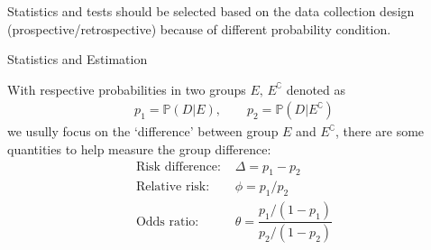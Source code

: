     Statistics and tests should be selected based on the data collection design (prospective/retrospective) because of different probability condition.
    
\begin{point}
    Statistics and Estimation
\end{point}


    With respective probabilities in two groups $ E,\,E^\complement $ denoted as
    \begin{align}
        p_1=\mathbb{P}\left( D|E \right),\qquad p_2=\mathbb{P}\left( D|E^\complement \right)   
    \end{align}
        we usully focus on the `difference' between group $ E $ and $ E^\complement $, there are some quantities to help measure the group difference:
\begin{align}
    \text{Risk difference: }&\Delta =p_1-p_2\\
    \text{Relative risk: }&\phi=p_1\big/p_2\\
    \text{Odds ratio: }&\theta=\dfrac{p_1/(1-p_1)}{p_2/(1-p_2)}
\end{align}

